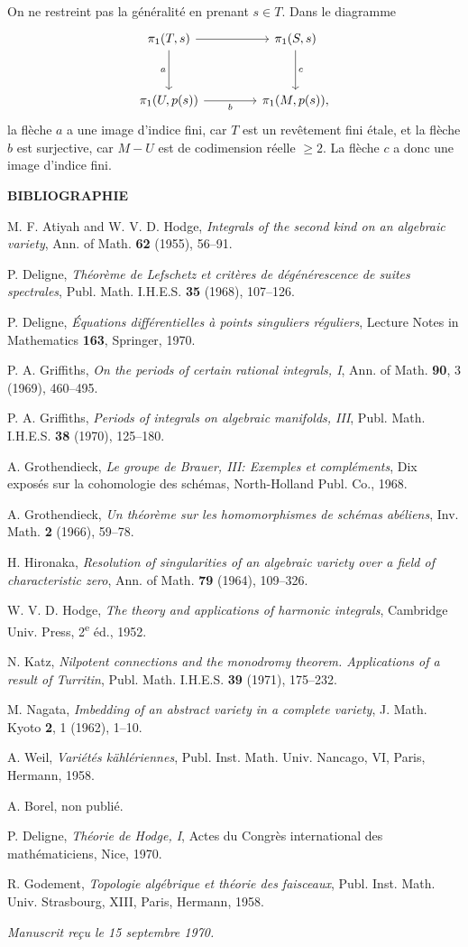 \documentclass[10pt]{article}
\begin{document}
On ne restreint pas la généralité en prenant $s\in T$. Dans le diagramme
\[
\begin{tikzcd}[column sep=4.2em,row sep=3.2em]
\pi_1(T,s) \arrow[r] \arrow[d,"a"'] & \pi_1(S,s) \arrow[d,"c"]\\
\pi_1(U,p(s)) \arrow[r,"b"'] & \pi_1(M,p(s)),
\end{tikzcd}
\]
la flèche $a$ a une image d'indice fini, car $T$ est un revêtement fini étale, et la flèche $b$ est surjective, car $M-U$ est de codimension réelle $\ge2$. La flèche $c$ a donc une image d'indice fini.

\begin{center}
\bfseries BIBLIOGRAPHIE
\end{center}

\begin{enumerate}[label={[\arabic*]},leftmargin=2.8em]
\item M. F. Atiyah and W. V. D. Hodge, \emph{Integrals of the second kind on an algebraic variety}, Ann. of Math. \textbf{62} (1955), 56--91.
\item P. Deligne, \emph{Théorème de Lefschetz et critères de dégénérescence de suites spectrales}, Publ. Math. I.H.E.S. \textbf{35} (1968), 107--126.
\item P. Deligne, \emph{Équations différentielles à points singuliers réguliers}, Lecture Notes in Mathematics \textbf{163}, Springer, 1970.
\item P. A. Griffiths, \emph{On the periods of certain rational integrals, I}, Ann. of Math. \textbf{90}, 3 (1969), 460--495.
\item P. A. Griffiths, \emph{Periods of integrals on algebraic manifolds, III}, Publ. Math. I.H.E.S. \textbf{38} (1970), 125--180.
\item A. Grothendieck, \emph{Le groupe de Brauer, III: Exemples et compléments}, Dix exposés sur la cohomologie des schémas, North-Holland Publ. Co., 1968.
\item A. Grothendieck, \emph{Un théorème sur les homomorphismes de schémas abéliens}, Inv. Math. \textbf{2} (1966), 59--78.
\item H. Hironaka, \emph{Resolution of singularities of an algebraic variety over a field of characteristic zero}, Ann. of Math. \textbf{79} (1964), 109--326.
\item W. V. D. Hodge, \emph{The theory and applications of harmonic integrals}, Cambridge Univ. Press, 2\textsuperscript{e} éd., 1952.
\item N. Katz, \emph{Nilpotent connections and the monodromy theorem. Applications of a result of Turritin}, Publ. Math. I.H.E.S. \textbf{39} (1971), 175--232.
\item M. Nagata, \emph{Imbedding of an abstract variety in a complete variety}, J. Math. Kyoto \textbf{2}, 1 (1962), 1--10.
\item A. Weil, \emph{Variétés kählériennes}, Publ. Inst. Math. Univ. Nancago, VI, Paris, Hermann, 1958.
\item A. Borel, non publié.
\item P. Deligne, \emph{Théorie de Hodge, I}, Actes du Congrès international des mathématiciens, Nice, 1970.
\end{enumerate}

\noindent[TF]\quad R. Godement, \emph{Topologie algébrique et théorie des faisceaux}, Publ. Inst. Math. Univ. Strasbourg, XIII, Paris, Hermann, 1958.

\begin{center}
\emph{Manuscrit reçu le 15 septembre 1970.}
\end{center}
\end{document}

